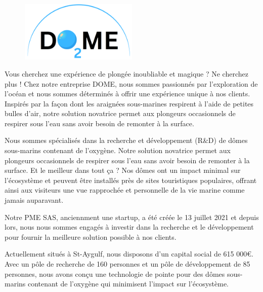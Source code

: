\documentclass[11pt, openright]{book}
\begin{document}
        
	
    \newpage

	\pagestyle{plain}

	\vspace{-2cm}

	\begin{figure}[ht!]
		\centering 
		\includegraphics[width=0.5\textwidth]{./Logo.png}
	\end{figure}

	\vspace{1cm}

Vous cherchez une expérience de plongée inoubliable et magique ? Ne cherchez plus ! Chez notre entreprise DOME, nous sommes passionnés par l'exploration de l'océan et nous sommes déterminés à offrir une expérience unique à nos clients. Inspirés par la façon dont les araignées sous-marines respirent à l'aide de petites bulles d'air, notre solution novatrice permet aux plongeurs occasionnels de respirer sous l'eau sans avoir besoin de remonter à la surface. 

Nous sommes spécialisés dans la recherche et développement (R&D) de dômes sous-marins contenant de l'oxygène. Notre solution novatrice permet aux plongeurs occasionnels de respirer sous l'eau sans avoir besoin de remonter à la surface. Et le meilleur dans tout ça ? Nos dômes ont un impact minimal sur l'écosystème et peuvent être installés près de sites touristiques populaires, offrant ainsi aux visiteurs une vue rapprochée et personnelle de la vie marine comme jamais auparavant.

Notre PME SAS, anciennment une startup, a été créée le 13 juillet 2021 et depuis lors, nous nous sommes engagés à investir dans la recherche et le développement pour fournir la meilleure solution possible à nos clients. 

Actuellement situés à St-Aygulf, nous disposons d'un capital social de 615 000€. Avec un pôle de recherche de 160 personnes et un pôle de développement de 85 personnes, nous avons conçu une technologie de pointe pour des dômes sous-marins contenant de l'oxygène qui minimisent l'impact sur l'écosystème.
\end{document}
